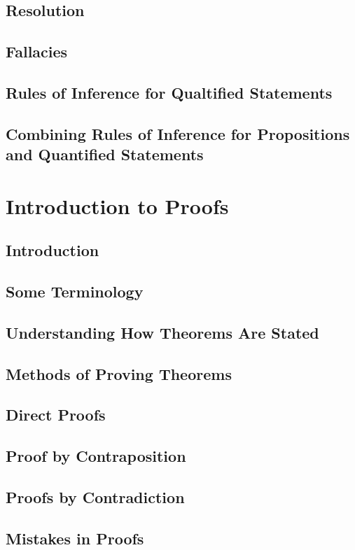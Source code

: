 \documentclass[11pt]{book}
\begin{document}
  \subsection{Resolution}
  \subsection{Fallacies}
  \subsection{Rules of Inference for Qualtified Statements}
  \subsection{Combining Rules of Inference for Propositions and Quantified Statements}
  
 \section{Introduction to Proofs}
  \subsection{Introduction}
  \subsection{Some Terminology}
  \subsection{Understanding How Theorems Are Stated}
  \subsection{Methods of Proving Theorems}
  \subsection{Direct Proofs}
  \subsection{Proof by Contraposition}
  \subsection{Proofs by Contradiction}
  \subsection{Mistakes in Proofs}
\end{document}
